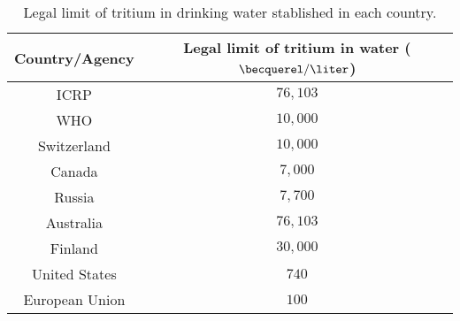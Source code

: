 \begin{table}[htbp]
\begin{center}
\begin{tabular}{|c|c|}
\hline
Country/Agency & Legal limit of tritium in water ($\becquerel/\liter$)\\
\hline \hline \hline
ICRP & $76,103$ \\ \hline
WHO & $10,000$ \\ \hline
Switzerland & $10,000$ \\ \hline
Canada & $7,000$ \\ \hline
Russia & $7,700$ \\ \hline
Australia & $76,103$ \\ \hline
Finland & $30,000$ \\ \hline
United States & $740$ \\ \hline
European Union & $100$ \\ \hline
\end{tabular}
\caption{Legal limit of tritium in drinking water stablished in each country.}
\label{tab:LegalLimitTritium}
\end{center}
\end{table}